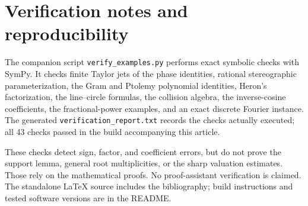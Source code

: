 \documentclass[11pt,letterpaper]{article}
\theoremstyle{definition}
\theoremstyle{remark}
\numberwithin{equation}{section}
\begin{document}
\section{Verification notes and reproducibility}\label{app:verification}
The companion script \texttt{verify\_examples.py} performs exact symbolic checks with SymPy. It checks finite Taylor jets of the phase identities, rational stereographic parameterization, the Gram and Ptolemy polynomial identities, Heron's factorization, the line--circle formulas, the collision algebra, the inverse-cosine coefficients, the fractional-power examples, and an exact discrete Fourier instance. The generated \texttt{verification\_report.txt} records the checks actually executed; all 43 checks passed in the build accompanying this article.

These checks detect sign, factor, and coefficient errors, but do not prove the support lemma, general root multiplicities, or the sharp valuation estimates. Those rely on the mathematical proofs. No proof-assistant verification is claimed. The standalone LaTeX source includes the bibliography; build instructions and tested software versions are in the README.
\end{document}
